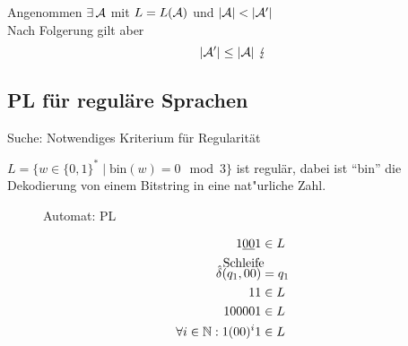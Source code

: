 Angenommen $\exists\,\mathcal{A}$ mit $L=L(\mathcal{A})$ und $|\A|<|\A'|$\\
Nach Folgerung gilt aber
\[ |\A'| \leq |\A|\ \lightning \]

\begin{minipage}{\textwidth} %
%
\subsection{\acf{PL} für reguläre Sprachen} %
Suche: Notwendiges Kriterium für Regularität
	\begin{Bsp*}
		$L = \{ w\in \{0,1\}^* \mid \text{bin}(w)=0\mod 3 \}$ ist regulär, dabei ist "`bin"' die Dekodierung von einem Bitstring in eine nat"urliche Zahl.
	\end{Bsp*}
	\begin{figure}[H]\centering
		\caption{Automat: \acl{PL}}
	\end{figure}
\end{minipage}
%
\begin{align*}
	1 \underline{0 0} 1 &\in L\\
	\hat\delta(\overset{\rlap{Schleife}}{q_1,00}) &= q_1\\
	11 &\in L\\
	100001 &\in L\\
	\forall i\in\N: 1(00)^i1 &\in L
\end{align*}

